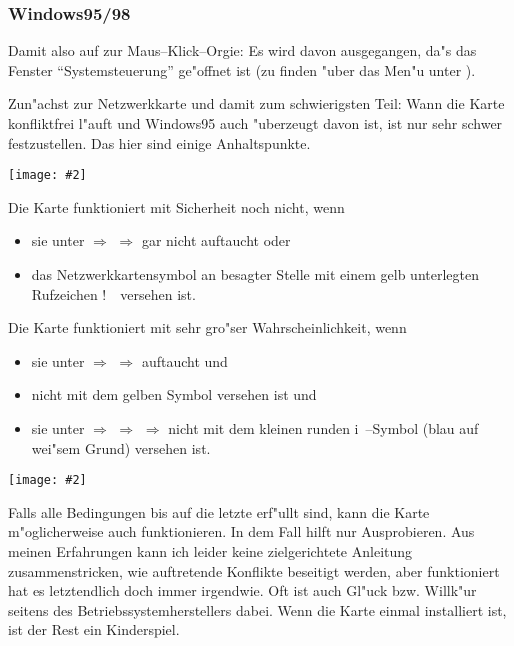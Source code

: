 \documentclass[12pt,titlepage,twoside]{scrartcl}
\newcommand{\centergraphics}[2][]{
\begin{center}
\texttt{[image: \#2]}
\end{center}
}
\begin{document}
\subsubsection{Windows95/98}

Damit also auf zur Maus--Klick--Orgie: Es wird davon ausgegangen, da"s das
Fenster "`Systemsteuerung"' ge"offnet ist (zu finden "uber das Men"u 
unter ).

Zun"achst zur Netzwerkkarte und damit zum
schwierigsten Teil: Wann die Karte konfliktfrei l"auft und Windows95 auch
"uberzeugt davon ist, ist nur sehr schwer festzustellen. Das hier sind einige
Anhaltspunkte.

\centergraphics[width=13.5cm]{W95Netzkarte}

Die Karte funktioniert mit Sicherheit noch nicht, wenn
\begin{itemize}
  \item sie unter  $\Rightarrow$ 
    $\Rightarrow$  gar nicht auftaucht oder
  \item das Netzwerkkartensymbol an besagter Stelle mit einem gelb unterlegten
    Rufzeichen \raisebox{0.4mm}{$\bigcirc$}\hspace{-2.7mm}!\ \ versehen ist.
\end{itemize}

Die Karte funktioniert mit sehr gro"ser Wahrscheinlichkeit, wenn 
\begin{itemize}
  \item sie unter  $\Rightarrow$ 
    $\Rightarrow$  auftaucht und
  \item nicht mit dem gelben Symbol versehen ist und 
  \item sie unter  $\Rightarrow$ 
    $\Rightarrow$  $\Rightarrow$  nicht mit
    dem kleinen runden \raisebox{0.2mm}{$\bigcirc$}\hspace{-2.7mm}i~--Symbol
    (blau auf wei"sem Grund) versehen ist.
\end{itemize}

\centergraphics{W95TCPIP}

Falls alle Bedingungen bis auf die letzte erf"ullt sind, kann die Karte
m"oglicherweise auch funktionieren. In dem Fall hilft nur Ausprobieren. Aus
meinen Erfahrungen kann ich leider keine zielgerichtete Anleitung
zusammenstricken, wie auftretende Konflikte beseitigt werden, aber
funktioniert hat es letztendlich doch immer irgendwie.
Oft ist auch Gl"uck bzw. Willk"ur seitens des Betriebssystemherstellers dabei.
Wenn die Karte einmal installiert ist, ist der Rest ein
Kinderspiel. 
\end{document}
